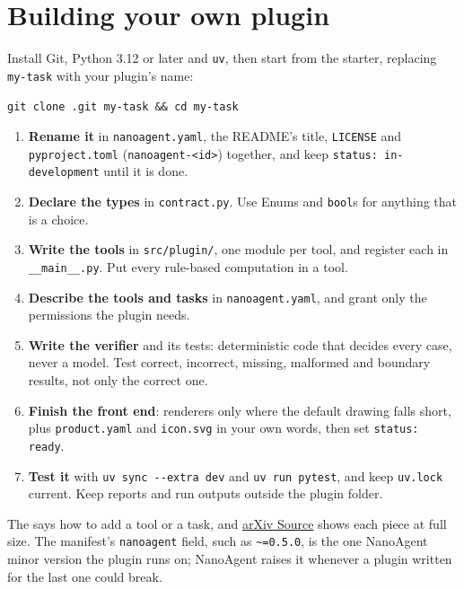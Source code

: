 \section{Building your own plugin}

Install Git, Python 3.12 or later and \texttt{uv}, then start from the
starter, replacing \texttt{my-task} with your plugin's name:

\begin{center}
\texttt{git clone \starter.git my-task \&\& cd my-task}
\end{center}

\begin{enumerate}
  \item \textbf{Rename it} in \texttt{nanoagent.yaml}, the README's title,
    \texttt{LICENSE} and \texttt{pyproject.toml} (\texttt{nanoagent-<id>})
    together, and keep \texttt{status: in-development} until it is done.
  \item \textbf{Declare the types} in \texttt{contract.py}. Use Enums and
    \texttt{bool}s for anything that is a choice.
  \item \textbf{Write the tools} in \texttt{src/plugin/}, one module per
    tool, and register each in \texttt{\_\_main\_\_.py}. Put every
    rule-based computation in a tool.
  \item \textbf{Describe the tools and tasks} in \texttt{nanoagent.yaml},
    and grant only the permissions the plugin needs.
  \item \textbf{Write the verifier} and its tests: deterministic code that
    decides every case, never a model. Test correct, incorrect, missing,
    malformed and boundary results, not only the correct one.
  \item \textbf{Finish the front end}: renderers only where the default
    drawing falls short, plus \texttt{product.yaml} and \texttt{icon.svg}
    in your own words, then set \texttt{status: ready}.
  \item \textbf{Test it} with \texttt{uv sync -{}-extra dev} and
    \texttt{uv run pytest}, and keep \texttt{uv.lock} current. Keep reports
    and run outputs outside the plugin folder.
\end{enumerate}

The  says how to add a tool or a task,
and \href{\arxiv}{arXiv Source} shows each piece at full size. The
manifest's \texttt{nanoagent} field, such as \texttt{\textasciitilde=0.5.0},
is the one NanoAgent minor version the plugin runs on; NanoAgent raises it
whenever a plugin written for the last one could break.
